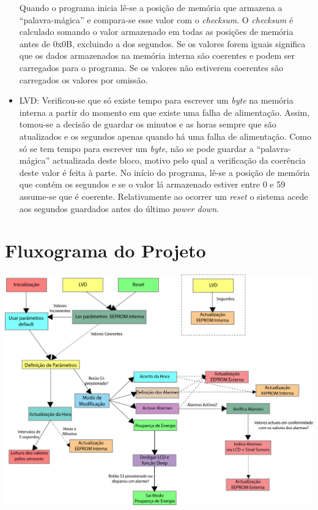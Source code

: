 \documentclass{article}
\begin{document}
\begin{itemize}
			Quando o programa inicia lê-se a posição de memória que armazena a ``palavra-mágica'' e compara-se esse valor com o \textit{checksum}. O \textit{checksum} é calculado somando o valor armazenado em todas as posições de memória antes de 0x0B, excluindo a dos segundos. Se os valores forem iguais significa que os dados armazenados na memória interna são coerentes e podem ser carregados para o programa. Se os valores não estiverem coerentes são carregados os valores por omissão.
		\item LVD:
			\subitem Verificou-se que só existe tempo para escrever um \textit{byte} na memória interna a partir do momento em que existe uma falha de alimentação. Assim, tomou-se a decisão de guardar os minutos e as horas sempre que são atualizados e os segundos apenas quando há uma falha de alimentação. Como só se tem tempo para escrever um \textit{byte}, não se pode guardar a ``palavra-mágica'' actualizada deste bloco, motivo pelo qual a verificação da coerência deste valor é feita à parte. No início do programa, lê-se a posição de memória que contém os segundos e se o valor lá armazenado estiver entre 0 e 59 assume-se que é coerente.
			Relativamente ao ocorrer um \textit{reset} o sistema acede aos segundos guardados antes do último \textit{power down}.
		\end{itemize}
		
		\section{Fluxograma do Projeto}
		\begin{center}
			\includegraphics[width=1\textwidth]{scemaqestados}
		\end{center}
		
	
\end{document}
